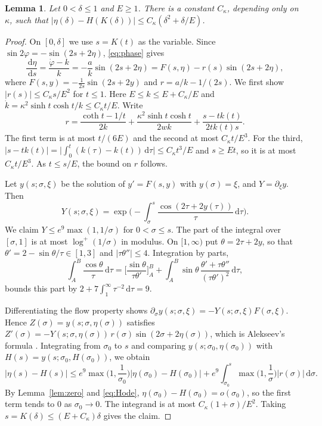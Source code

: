 \documentclass[11pt]{amsart}
\newtheorem{lemma}[theorem]{Lemma}
\theoremstyle{definition}
\newcommand{\dd}{\,\mathrm{d}}
\begin{document}
\begin{lemma}\label{lem:inner}
Let $0<\delta\le1$ and $E\ge1$. There is a constant $C_\kappa$, depending only on $\kappa$, such that $|\eta(\delta)-H(K(\delta))|\le C_\kappa(\delta^2+\delta/E)$.
\end{lemma}

\begin{proof}
On $[0,\delta]$ we use $s=K(t)$ as the variable. Since $\sin2\varphi=-\sin(2s+2\eta)$, \eqref{eq:phase} gives
\[
\frac{\dd\eta}{\dd s}=\frac{\dot\varphi-k}{k}=-\frac ak\sin(2s+2\eta)=F(s,\eta)-r(s)\sin(2s+2\eta),
\]
where $F(s,y)=-\frac1{2s}\sin(2s+2y)$ and $r=a/k-1/(2s)$. We first show $|r(s)|\le C_\kappa s/E^2$ for $t\le1$. Here $E\le k\le E+C_\kappa/E$ and $\dot k=\kappa^2\sinh t\cosh t/k\le C_\kappa t/E$. Write
\[
r=\frac{\coth t-1/t}{2k}+\frac{\kappa^2\sinh t\cosh t}{2wk}+\frac{s-tk(t)}{2tk(t)s}.
\]
The first term is at most $t/(6E)$ and the second at most $C_\kappa t/E^3$. For the third, $|s-tk(t)|=\big|\int_0^t(k(\tau)-k(t))\dd\tau\big|\le C_\kappa t^3/E$ and $s\ge Et$, so it is at most $C_\kappa t/E^3$. As $t\le s/E$, the bound on $r$ follows.

Let $y(s;\sigma,\xi)$ be the solution of $y'=F(s,y)$ with $y(\sigma)=\xi$, and $Y=\partial_\xi y$. Then
\[
Y(s;\sigma,\xi)=\exp\Big(-\int_\sigma^s\frac{\cos(2\tau+2y(\tau))}{\tau}\dd\tau\Big).
\]
We claim $Y\le e^{9}\max(1,1/\sigma)$ for $0<\sigma\le s$. The part of the integral over $[\sigma,1]$ is at most $\log^+(1/\sigma)$ in modulus. On $[1,\infty)$ put $\theta=2\tau+2y$, so that $\theta'=2-\sin\theta/\tau\in[1,3]$ and $|\tau\theta''|\le4$. Integration by parts,
\[
\int_A^B\frac{\cos\theta}{\tau}\dd\tau=\Big[\frac{\sin\theta}{\tau\theta'}\Big]_A^B+\int_A^B\sin\theta\,\frac{\theta'+\tau\theta''}{(\tau\theta')^2}\dd\tau,
\]
bounds this part by $2+7\int_1^\infty\tau^{-2}\dd\tau=9$.

Differentiating the flow property shows $\partial_\sigma y(s;\sigma,\xi)=-Y(s;\sigma,\xi)F(\sigma,\xi)$. Hence $Z(\sigma)=y(s;\sigma,\eta(\sigma))$ satisfies $Z'(\sigma)=-Y(s;\sigma,\eta(\sigma))\,r(\sigma)\sin(2\sigma+2\eta(\sigma))$, which is Alekseev's formula \cite{Ale61}. Integrating from $\sigma_0$ to $s$ and comparing $y(s;\sigma_0,\eta(\sigma_0))$ with $H(s)=y(s;\sigma_0,H(\sigma_0))$, we obtain
\[
|\eta(s)-H(s)|\le e^9\max\Big(1,\frac1{\sigma_0}\Big)|\eta(\sigma_0)-H(\sigma_0)|+e^9\int_{\sigma_0}^s\max\Big(1,\frac1\sigma\Big)|r(\sigma)|\dd\sigma .
\]
By Lemma~\ref{lem:zero} and \eqref{eq:Hode}, $\eta(\sigma_0)-H(\sigma_0)=o(\sigma_0)$, so the first term tends to $0$ as $\sigma_0\to0$. The integrand is at most $C_\kappa(1+\sigma)/E^2$. Taking $s=K(\delta)\le(E+C_\kappa)\delta$ gives the claim.
\end{proof}
\end{document}
